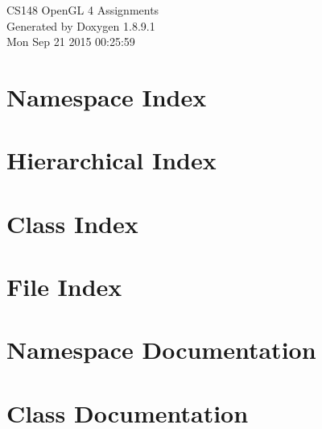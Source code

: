 \documentclass[twoside]{book}
\newcommand{\+}{\discretionary{\mbox{\scriptsize$\hookleftarrow$}}{}{}}
\newcommand{\clearemptydoublepage}{%
  \newpage{\pagestyle{empty}\cleardoublepage}%
}
\begin{document}
\hypersetup{pageanchor=false,
             bookmarks=true,
             bookmarksnumbered=true,
             pdfencoding=unicode
            }
\begin{titlepage}
\vspace*{7cm}
\begin{center}%
{\Large C\+S148 Open\+G\+L 4 Assignments }\\
\vspace*{1cm}
{\large Generated by Doxygen 1.8.9.1}\\
\vspace*{0.5cm}
{\small Mon Sep 21 2015 00:25:59}\\
\end{center}
\end{titlepage}
\clearemptydoublepage
\tableofcontents
\clearemptydoublepage
{}
\hypersetup{pageanchor=true}

\chapter{Namespace Index}

\chapter{Hierarchical Index}

\chapter{Class Index}

\chapter{File Index}

\chapter{Namespace Documentation}



\chapter{Class Documentation}



















\end{document}
